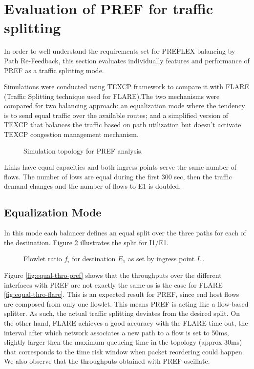 \section{Evaluation of PREF for traffic splitting}

In order to well understand the requirements set for PREFLEX balancing by Path Re-Feedback, this section evaluates individually features and performance of PREF as a traffic splitting mode.  

Simulations were conducted using TEXCP framework to compare it with FLARE (Traffic Splitting technique used for FLARE).The two mechanisms were compared for two balancing approach: an equalization mode where the tendency is to send equal traffic over the available routes; and a simplified  version of TEXCP that balances the traffic based on path utilization but doesn't activate TEXCP congestion management mechanism.
 
\begin{figure}[h!]
\begin{center}
\caption{
 Simulation topology for PREF analysis. 
 \label{fig:fwnd}
}
\end{center}
\end{figure}

Links have equal capacities and both  ingress points serve the same number of flows. The number of lows are equal during the first 300 sec, then the traffic demand changes and the number of flows to  E1 is doubled.

\subsection{Equalization Mode}

In this mode each balancer defines an equal split over the three paths for each of the destination. Figure \ref{fig:fwnd} illustrates the split for I1/E1. 

\begin{figure}[h!]
 \begin{center}
\caption{
 Flowlet ratio $f_{i}$ for destination $E_{1}$ as set by ingress point $I_{1}$.
   \label{fig:fwnd}
}
\end{center}
\end{figure}

Figure \ref{fig:equal-thro-pref} shows that the throughputs over the different interfaces with PREF are not exactly the same as is the case for FLARE \ref{fig:equal-thro-flare}.  This is an expected result for PREF, since end host flows are composed from only one flowlet.  This means PREF is acting like a flow-based splitter. 
As such, the actual traffic splitting deviates from the desired split. On the other hand, FLARE achieves a good accuracy with the FLARE time out, the interval after which network associates a new path to a flow is set to 50ms, slightly larger then the maximum queueing time in the topology (approx 30ms) that corresponds to the time risk window when packet reordering could happen. We also observe that the throughputs obtained with PREF oscillate.


